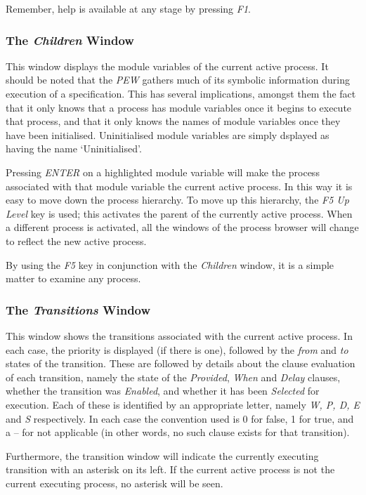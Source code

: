 Remember, help is available at any stage by pressing {\em F1}.

\subsubsection[The {\em Children} Window]{The {\em Children} Window}

This window displays the module variables of the current active
process. It should be noted that the {\em PEW} gathers much of its
symbolic information during execution of a specification. This has
several implications, amongst them the fact that it only knows that a
process has module variables once it begins to execute that process,
and that it only knows the names of module variables once they have
been initialised. Uninitialised module variables are simply dsplayed
as having the name `Uninitialised'.

Pressing {\em ENTER} on a highlighted module variable will make the
 process associated with
that module variable the current active process. In this way it is
easy to move down the process hierarchy. To move up this hierarchy,
the {\em F5 Up Level} key is used; this activates the parent of the
currently active process. When a different process is activated, all 
the windows of the process browser will change to reflect the new
active process.

By using the {\em F5} key in conjunction with the {\em Children}
window, it is a simple matter to examine any process.

\subsubsection[The {\em Transitions} Window]{The {\em Transitions} Window}

This window shows the transitions associated with the current active
process. In each case, the priority is displayed (if there is one),
followed by the {\em from} and {\em to} states of the transition.
These are followed by details about the clause evaluation of each
transition, namely the state of the {\em Provided}, {\em When} and
{\em Delay} clauses, whether the transition was {\em Enabled}, and
whether it has been {\em Selected} for execution. Each of these is
identified by an appropriate letter, namely {\em W, P, D, E} and {\em S}
respectively. In each case the convention used is 0 for false, 1 for
true, and a -- for not applicable (in other words, no such clause
exists for that transition).

Furthermore, the transition window will indicate the
currently executing transition with an asterisk on its left. If the
current active process is not the current executing process, no
asterisk will be seen.

